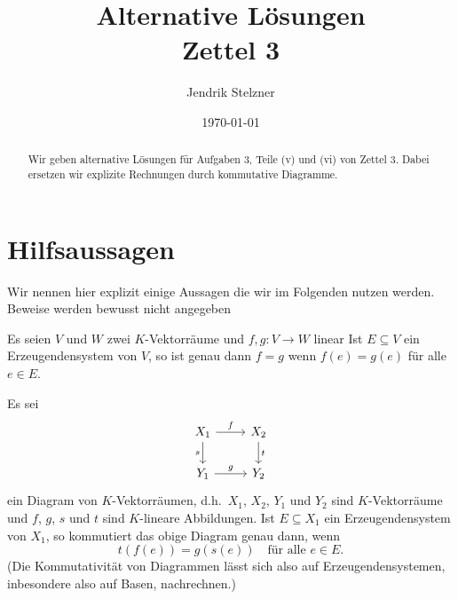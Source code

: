 \documentclass[a4paper,10pt]{article}
\title{Alternative Lösungen \\ Zettel 3}
\author{Jendrik Stelzner}
\date{\today}
\begin{document}
\maketitle










\begin{abstract}
  Wir geben alternative Lösungen für Aufgaben 3, Teile (v) und (vi) von Zettel 3.
  Dabei ersetzen wir explizite Rechnungen durch kommutative Diagramme.
\end{abstract}










\section{Hilfsaussagen}

Wir nennen hier explizit einige Aussagen die wir im Folgenden nutzen werden.
Beweise werden bewusst nicht angegeben

\begin{lemma}
  Es seien $V$ und $W$ zwei $K$-Vektorräume und $f, g \colon V \to W$ linear
  Ist $E \subseteq V$ ein Erzeugendensystem von $V$, so ist genau dann $f = g$ wenn $f(e) = g(e)$ für alle $e \in E$.
\end{lemma}


\begin{corollary}
  Es sei
  \[
    \begin{tikzcd}
        X_1
        \arrow[r, "f"]
        \arrow[d, "s"']
      & X_2
        \arrow[d, "t"]
      \\
        Y_1
        \arrow[r, "g"]
      & Y_2
    \end{tikzcd}
  \]
  ein Diagram von $K$-Vektorräumen, d.h.\ $X_1$, $X_2$, $Y_1$ und $Y_2$ sind $K$-Vektorräume und $f$, $g$, $s$ und $t$ sind $K$-lineare Abbildungen.
  Ist $E \subseteq X_1$ ein Erzeugendensystem von $X_1$, so kommutiert das obige Diagram genau dann, wenn
  \[
    t(f(e)) = g(s(e))
    \quad
    \text{für alle $e \in E$}.
  \]
  (Die Kommutativität von Diagrammen lässt sich also auf Erzeugendensystemen, inbesondere also auf Basen, nachrechnen.)
\end{corollary}
\end{document}
